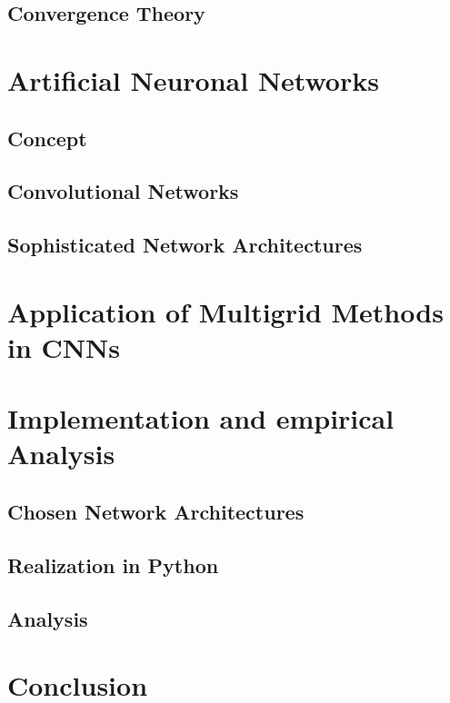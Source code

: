 \documentclass[a4paper,12pt,titlepage,enabledeprecatedfontcommands]{scrreprt}
\begin{document}
\section{Convergence Theory}
\chapter{Artificial Neuronal Networks}
\section{Concept}
\section{Convolutional Networks}
\section{Sophisticated Network Architectures}
\chapter{Application of Multigrid Methods in CNNs}
\chapter{Implementation and empirical Analysis}
\section{Chosen Network Architectures}
\section{Realization in Python}
\section{Analysis}
\chapter{Conclusion}


 \label{bibtex}
\end{document}
